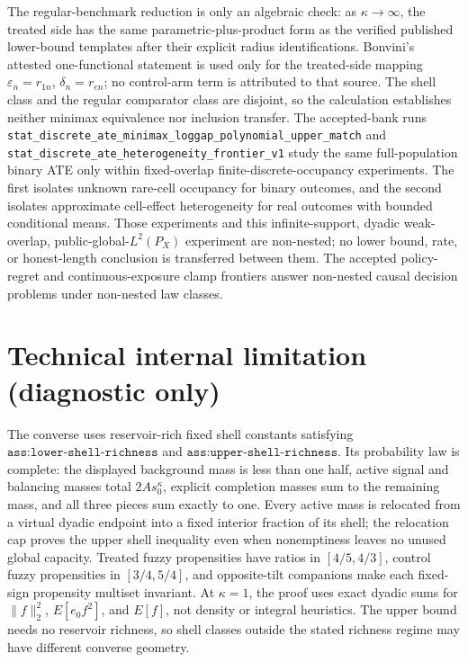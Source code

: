 \documentclass{article}
\begin{document}
The regular-benchmark reduction is only an algebraic check: as \(\kappa\to\infty\), the treated side has the same parametric-plus-product form as the verified published lower-bound templates after their explicit radius identifications. Bonvini's attested one-functional statement is used only for the treated-side mapping \(\varepsilon_n=r_{1n}\), \(\delta_n=r_{en}\); no control-arm term is attributed to that source. The shell class and the regular comparator class are disjoint, so the calculation establishes neither minimax equivalence nor inclusion transfer. The accepted-bank runs \texttt{stat\_discrete\_ate\_minimax\_loggap\_polynomial\_upper\_match} and \texttt{stat\_discrete\_ate\_heterogeneity\_frontier\_v1} study the same full-population binary ATE only within fixed-overlap finite-discrete-occupancy experiments. The first isolates unknown rare-cell occupancy for binary outcomes, and the second isolates approximate cell-effect heterogeneity for real outcomes with bounded conditional means. Those experiments and this infinite-support, dyadic weak-overlap, public-global-\(L^2(P_X)\) experiment are non-nested; no lower bound, rate, or honest-length conclusion is transferred between them. The accepted policy-regret and continuous-exposure clamp frontiers answer non-nested causal decision problems under non-nested law classes.

\section*{Technical internal limitation (diagnostic only)}

The converse uses reservoir-rich fixed shell constants satisfying \(\texttt{ass:lower-shell-richness}\) and \(\texttt{ass:upper-shell-richness}\). Its probability law is complete: the displayed background mass is less than one half, active signal and balancing masses total \(2As_0^\kappa\), explicit completion masses sum to the remaining mass, and all three pieces sum exactly to one. Every active mass is relocated from a virtual dyadic endpoint into a fixed interior fraction of its shell; the relocation cap proves the upper shell inequality even when nonemptiness leaves no unused global capacity. Treated fuzzy propensities have ratios in \([4/5,4/3]\), control fuzzy propensities in \([3/4,5/4]\), and opposite-tilt companions make each fixed-sign propensity multiset invariant. At \(\kappa=1\), the proof uses exact dyadic sums for \(\lVert f\rVert_2^2\), \(E[e_0f^2]\), and \(E[f]\), not density or integral heuristics. The upper bound needs no reservoir richness, so shell classes outside the stated richness regime may have different converse geometry.
\end{document}
